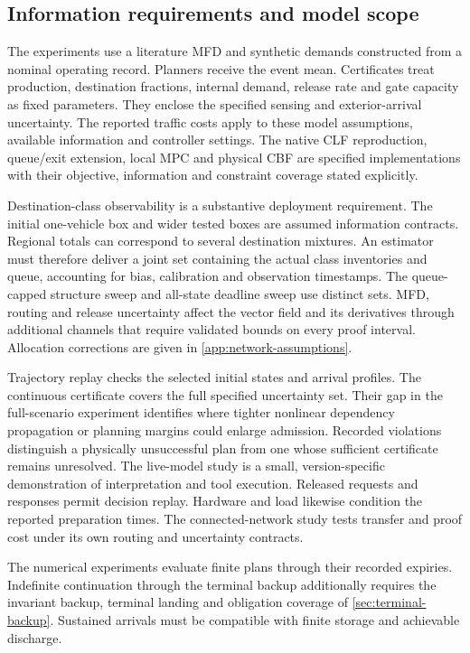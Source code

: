 \documentclass[preprint,12pt]{elsarticle}
\newcommand{\appref}[1]{\ref{#1}}
\begin{document}
\subsection{Information requirements and model scope}
\label{sec:information-model-scope}

The experiments use a literature MFD and synthetic demands constructed from
a nominal operating record. Planners receive the event mean. Certificates
treat production, destination fractions, internal demand, release rate and
gate capacity as fixed parameters. They enclose the specified sensing and
exterior-arrival uncertainty. The reported traffic costs apply to these model assumptions, available
information and controller settings. The native CLF reproduction, queue/exit
extension, local MPC and physical CBF are specified implementations with
their objective, information and constraint coverage stated explicitly.

Destination-class observability is a substantive deployment requirement.
The initial one-vehicle box and wider tested boxes are assumed information
contracts. Regional totals can correspond to several destination mixtures.
An estimator must therefore deliver a joint set containing the actual class inventories
and queue, accounting for bias, calibration and observation timestamps.
The queue-capped structure sweep and all-state deadline sweep use distinct
sets. MFD, routing and release uncertainty affect the vector field and its
derivatives through additional channels that require validated bounds on
every proof interval. Allocation corrections are given in
\appref{app:network-assumptions}.

Trajectory replay checks the selected initial states and arrival profiles.
The continuous certificate covers the full specified uncertainty set. Their gap in the full-scenario experiment identifies where tighter
nonlinear dependency propagation or planning margins could enlarge admission.
Recorded violations distinguish a physically unsuccessful plan from one
whose sufficient certificate remains unresolved. The live-model study is a
small, version-specific demonstration of interpretation and tool execution.
Released requests and responses permit decision replay. Hardware and load
likewise condition the reported preparation times. The connected-network
study tests transfer and proof cost under its own routing and uncertainty
contracts.

The numerical experiments evaluate finite plans through their recorded
expiries. Indefinite continuation through the terminal backup additionally
requires the invariant backup, terminal landing and obligation coverage of
\appref{sec:terminal-backup}. Sustained arrivals must be compatible with
finite storage and achievable discharge.
\end{document}
